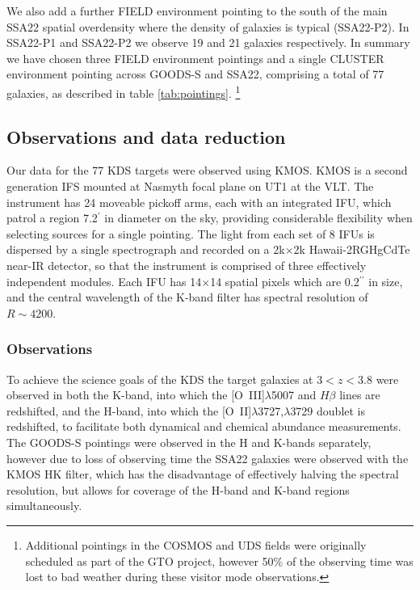 \documentclass[fleqn,usenatbib]{mn2e}
\begin{document}
We also add a further FIELD environment pointing to the south of the main SSA22 spatial overdensity where the density of galaxies is typical (SSA22-P2).
In SSA22-P1 and SSA22-P2 we observe 19 and 21 galaxies respectively.
In summary we have chosen three FIELD environment pointings and a single CLUSTER environment pointing across GOODS-S and SSA22, comprising a total of 77 galaxies, as described in table \ref{tab:pointings}. \footnote{Additional pointings in the COSMOS and UDS fields were originally scheduled as part of the GTO project, however 50$\%$ of the observing time was lost to bad weather during these visitor mode observations.}

\subsection{Observations and data reduction}\label{subsubsec:observations_and_dr}
Our data for the 77 KDS targets were observed using KMOS.
KMOS is a second generation IFS mounted at Nasmyth focal plane on UT1 at the VLT.
The instrument has 24 moveable pickoff arms, each with an integrated IFU, which patrol a region 7.2$^{\prime}$ in diameter on the sky, providing considerable flexibility when selecting sources for a single pointing.
The light from each set of 8 IFUs is dispersed by a single spectrograph and recorded on a 2k$\times$2k Hawaii-2RGHgCdTe near-IR detector, so that the instrument is comprised of three effectively independent modules.
Each IFU has 14$\times$14 spatial pixels which are 0.2$^{\prime\prime}$ in size, and the central wavelength of the K-band filter has spectral resolution of $R \sim 4200$.
\subsubsection{Observations}\label{subsubsec:Obs}
To achieve the science goals of the KDS the target galaxies at $3 < z < 3.8$ were observed in both the K-band, into which the [O~{\sc III}]$\lambda$5007 and $H\beta$ lines are redshifted, and the H-band, into which the [O~{\sc II}]$\lambda$3727,$\lambda$3729 doublet is redshifted, to facilitate both dynamical and chemical abundance measurements.
The GOODS-S pointings were observed in the H and K-bands separately, however due to loss of observing time the SSA22 galaxies were observed with the KMOS HK filter, which has the disadvantage of effectively halving the spectral resolution, but allows for coverage of the H-band and K-band regions simultaneously. \\
\end{document}
